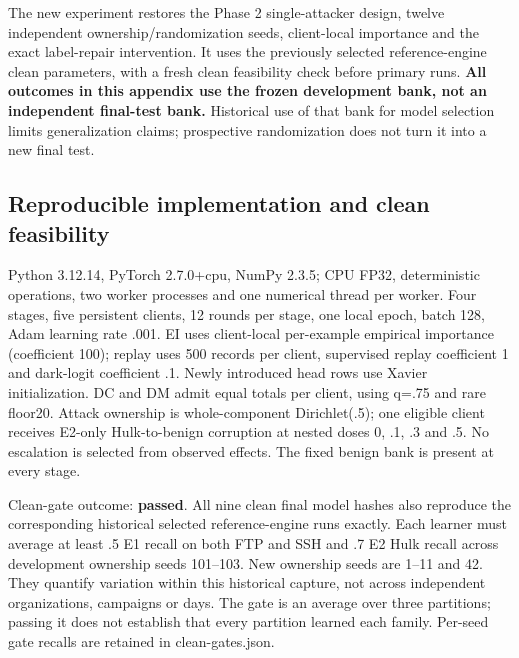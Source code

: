 \documentclass[
  10pt,
  a4paper,
]{article}
\begin{document}
The new experiment restores the Phase 2 single-attacker design, twelve
independent ownership/randomization seeds, client-local importance and
the exact label-repair intervention. It uses the previously selected
reference-engine clean parameters, with a fresh clean feasibility check
before primary runs. \textbf{All outcomes in this appendix use the
frozen development bank, not an independent final-test bank.} Historical
use of that bank for model selection limits generalization claims;
prospective randomization does not turn it into a new final test.

\hypertarget{reproducible-implementation-and-clean-feasibility}{%
\subsection{Reproducible implementation and clean
feasibility}\label{reproducible-implementation-and-clean-feasibility}}

Python 3.12.14, PyTorch 2.7.0+cpu, NumPy 2.3.5; CPU FP32, deterministic
operations, two worker processes and one numerical thread per worker.
Four stages, five persistent clients, 12 rounds per stage, one local
epoch, batch 128, Adam learning rate .001. EI uses client-local
per-example empirical importance (coefficient 100); replay uses 500
records per client, supervised replay coefficient 1 and dark-logit
coefficient .1. Newly introduced head rows use Xavier initialization. DC
and DM admit equal totals per client, using q=.75 and rare floor20.
Attack ownership is whole-component Dirichlet(.5); one eligible client
receives E2-only Hulk-to-benign corruption at nested doses 0, .1, .3 and
.5. No escalation is selected from observed effects. The fixed benign
bank is present at every stage.

Clean-gate outcome: \textbf{passed}. All nine clean final model hashes
also reproduce the corresponding historical selected reference-engine
runs exactly. Each learner must average at least .5 E1 recall on both
FTP and SSH and .7 E2 Hulk recall across development ownership seeds
101--103. New ownership seeds are 1--11 and 42. They quantify variation
within this historical capture, not across independent organizations,
campaigns or days. The gate is an average over three partitions; passing
it does not establish that every partition learned each family. Per-seed
gate recalls are retained in clean-gates.json.
\end{document}
